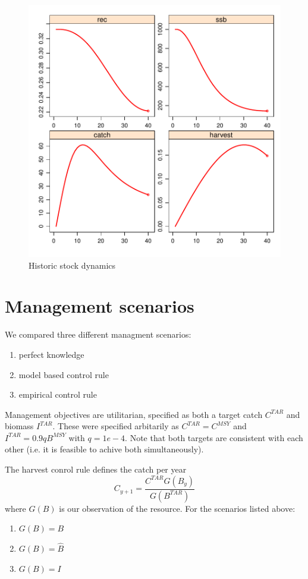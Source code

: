 \documentclass[a4paper]{article}
\begin{document}
\begin{figure}
\centering
\includegraphics{script-hist_proj_plot}
\caption{Historic stock dynamics}
\label{fig:hist_proj}
\end{figure}


\section{Management scenarios}

We compared three different managment scenarios:
\begin{enumerate}
\item perfect knowledge
\item model based control rule
\item empirical control rule
\end{enumerate}

Management objectives are utilitarian, specified as both a target catch $C^{TAR}$ and biomass $I^{TAR}$. 
These were specified arbitarily as $C^{TAR} = C^{MSY}$ and $I^{TAR} = 0.9 q B^{MSY}$ with $q=1e-4$.
Note that both targets are consistent with each other (i.e. it is feasible to achive both simultaneously).

The harvest conrol rule defines the catch per year
\[
C_{y+1} = \frac{C^{TAR}G(B_y)}{G(B^{TAR})}
\]
where $G(B)$ is our observation of the resource. For the scenarios listed above:
\begin{enumerate}
\item $G(B) = B$
\item $G(B) = \hat{B}$
\item $G(B) = I$
\end{enumerate}
\end{document}
